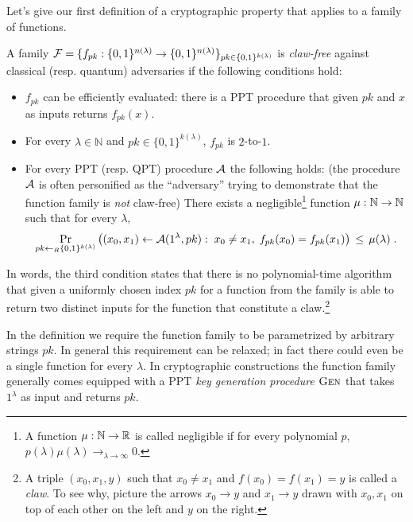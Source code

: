 Let's give our first definition of a cryptographic property that applies to a family of functions. 

\begin{definition}
A family $\mathcal{F} = \{f_{pk}: \{0,1\}^{n(\lambda)} \to \{0,1\}^{n(\lambda)}\}_{pk\in\{0,1\}^{k(\lambda)}}$ is \emph{claw-free} against classical (resp. quantum) adversaries if 
the following conditions hold:
\begin{itemize}
\item $f_{pk}$ can be efficiently evaluated: there is a PPT procedure that given $pk$ and $x$ as inputs returns $f_{pk}(x)$.
\item For every $\lambda\in \mathbb{N}$ and  $pk\in\{0,1\}^{k(\lambda)}$, $f_{pk}$ is $2$-to-$1$.
\item For every PPT (resp. QPT) procedure $\mathcal{A}$ the following holds: (the procedure $\mathcal{A}$ is often personified as the ``adversary'' trying to demonstrate that the function family is \emph{not} claw-free) There exists a negligible\footnote{A function $\mu:\mathbb{N}\to\mathbb{R}$ is called {negligible} if for every polynomial $p$, $p(\lambda)\mu(\lambda)\to_{\lambda\to\infty} 0$.} function $\mu:\mathbb{N}\to\mathbb{N}$ such that for every $\lambda$, 
\[ \Pr_{pk\leftarrow_R \{0,1\}^{k(\lambda)}}\big( (x_0,x_1)\leftarrow \mathcal{A}(1^\lambda,pk):\; x_0\neq x_1,\; f_{pk}(x_0)= f_{pk}(x_1)\big) \,\leq\, \mu(\lambda)\;.\]
\end{itemize}
\end{definition}

In words, the third condition states that there is no polynomial-time algorithm that given a uniformly chosen index $pk$ for a function from the family is able to return two distinct inputs for the function that constitute a claw.\footnote{A triple $(x_0,x_1,y)$ such that $x_0\neq x_1$ and $f(x_0)=f(x_1)=y$ is called a \emph{claw}. To see why, picture the arrows $x_0\rightarrow y$ and $x_1\rightarrow y$ drawn with $x_0,x_1$ on top of each other on the left and $y$ on the right.}

\begin{remark}
In the definition we require the function family to be parametrized by arbitrary strings $pk$. In general this requirement can be relaxed; in fact there could even be a single function for every $\lambda$. In cryptographic constructions the function family generally comes equipped with a PPT \emph{key generation procedure} $\textsc{Gen}$ that takes $1^\lambda$ as input and returns $pk$.
\end{remark}

